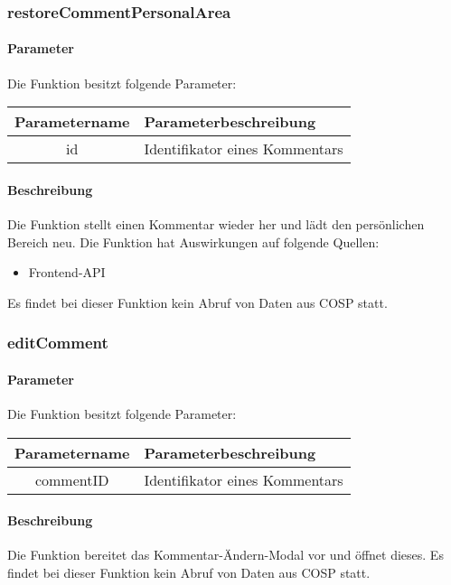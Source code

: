 \subsubsection{restoreCommentPersonalArea}
\paragraph{Parameter} Die Funktion besitzt folgende Parameter:
\begin{table}[H]
	\begin{tabular}{|c|p{11cm}|}
		\hline
		\textbf{Parametername} & \textbf{Parameterbeschreibung} \\ \hline
		id & Identifikator eines Kommentars \\ \hline
	\end{tabular}
\end{table}
\paragraph{Beschreibung} Die Funktion stellt einen Kommentar wieder her und lädt den persönlichen Bereich neu. Die Funktion hat Auswirkungen auf folgende Quellen:
\begin{itemize}
	\item Frontend-API
\end{itemize}
Es findet bei dieser Funktion kein Abruf von Daten aus {\glqq COSP\grqq} statt.
\subsubsection{editComment}
\paragraph{Parameter} Die Funktion besitzt folgende Parameter:
\begin{table}[H]
	\begin{tabular}{|c|p{11cm}|}
		\hline
		\textbf{Parametername} & \textbf{Parameterbeschreibung} \\ \hline
		commentID & Identifikator eines Kommentars \\ \hline
	\end{tabular}
\end{table}
\paragraph{Beschreibung} Die Funktion bereitet das Kommentar-Ändern-Modal vor und öffnet dieses. Es findet bei dieser Funktion kein Abruf von Daten aus {\glqq COSP\grqq} statt.
